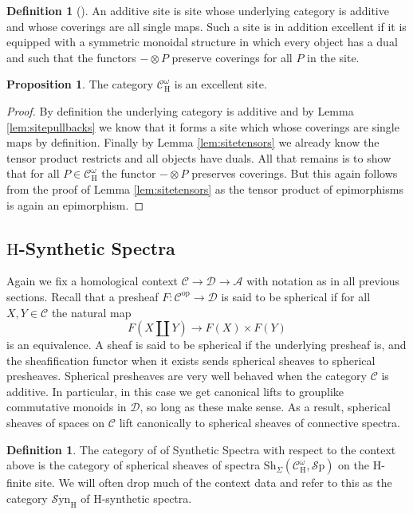 \documentclass[10pt]{amsart}
\theoremstyle{definition}
\numberwithin{figure}{section}
\numberwithin{equation}{section}
\newtheorem{proposition}[figure]{Proposition}
\newtheorem{definition}[figure]{Definition}
\newcommand{\op}{\mathrm{op}}
\newcommand{\cA}{\mathcal{A}}
\newcommand{\cC}{\mathcal{C}}
\newcommand{\cD}{\mathcal{D}}
\theoremstyle{cited}
\newcommand{\Sp}{{\mathcal{S}\mathrm{p}}}
\newcommand{\Sh}{\mathrm{Sh}}
\newcommand{\Syn}{\mathcal{S}\mathrm{yn}}
\renewcommand{\H}{\mathrm{H}}
\begin{document}
\begin{definition}[\cite{Pst22}]
  An additive site is site whose underlying category is additive and whose coverings are all single maps. Such a site is in addition excellent if it is equipped with a symmetric monoidal structure in which every object has a dual and such that the functors $-\otimes P$ preserve coverings for all $P$ in the site.
\end{definition}

\begin{proposition}
  The category $\cC^\omega_\H$ is an excellent site.
\end{proposition}

\begin{proof}
  By definition the underlying category is additive and by Lemma \ref{lem:sitepullbacks} we know that it forms a site which whose coverings are single maps by definition. Finally by Lemma \ref{lem:sitetensors} we already know the tensor product restricts and all objects have duals. All that remains is to show that for all $P\in \cC^\omega_\H$ the functor $-\otimes P$ preserves coverings. But this again follows from the proof of Lemma \ref{lem:sitetensors} as the tensor product of epimorphisms is again an epimorphism.
\end{proof}

\subsection{$\H$-Synthetic Spectra}

Again we fix a homological context $\cC\to \cD\to \cA$ with notation as in all previous sections. Recall that a presheaf $F:\cC^\op\to \cD$ is said to be spherical if for all $X,Y\in \cC$ the natural map
\[
F(X\amalg Y)\to F(X)\times F(Y)
\]
is an equivalence. A sheaf is said to be spherical if the underlying presheaf is, and the sheafification functor when it exists sends spherical sheaves to spherical presheaves. Spherical presheaves are very well behaved when the category $\cC$ is additive. In particular, in this case we get canonical lifts to grouplike commutative monoids in $\cD$, so long as these make sense. As a result, spherical sheaves of spaces on $\cC$ lift canonically to spherical sheaves of connective spectra.

\begin{definition}
  The category of of Synthetic Spectra with respect to the context above is the category of spherical sheaves of spectra $\Sh_\Sigma(\cC^\omega_\H, \Sp)$ on the $\H$-finite site. We will often drop much of the context data and refer to this as the category $\Syn_\H$ of $\H$-synthetic spectra.
\end{definition}
\end{document}
